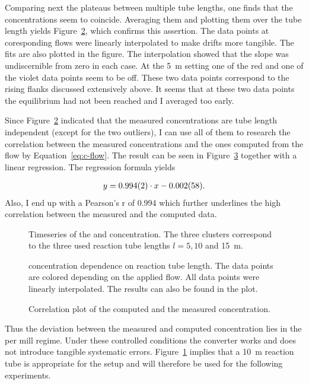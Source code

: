 Comparing next the  plateaus between multiple tube lengths, one
finds that the concentrations seem to coincide. Averaging them and
plotting them over the tube length yields Figure~\ref{fig:no-length},
which confirms this assertion. The data points at coresponding flows
were linearly interpolated to make drifts more tangible. The fits are
also plotted in the figure. The interpolation showed that the slope
was undiscernible from zero in each case. At the \SI{5}{\meter}
setting one of the red and one of the violet data points seem to be
off. These two data points correspond to the rising flanks discussed
extensively above. It seems that at these two data points the
equilibrium had not been reached and I averaged too early.

Since Figure~\ref{fig:no-length} indicated that the measured
concentrations are tube length independent (except for the two
outliers), I can use all of them to research the correlation between
the measured concentrations and the ones computed from the flow by
Equation~\eqref{eq:c-flow}. The result can be seen in
Figure~\ref{fig:no-calib} together with a linear regression. The
regression formula yields

\begin{align*}
  y = \num{0.994 \pm 0.002}  \cdot x -\num{0.002 \pm 0.058}.
\end{align*}
Also, I end up with a Pearson's r of 0.994 which further underlines the high
correlation between the measured and the computed data.
\begin{figure}[htbp]
  \centering
  
  \hfill
  
  \caption{Timeseries of the  and  concentration. The
    three clusters correspond to the three used reaction tube lengths
    $l = 5, 10$ and \SI{15}{\meter}.}
  \label{fig:ts}
\end{figure}
\begin{figure}[htbp]
  \centering
  
  \caption{ concentration dependence on reaction tube
    length. The data points are colored depending on the applied
     flow. All data points were linearly interpolated. The
    results can also be found in the plot.}
  \label{fig:no-length}
\end{figure}

\begin{figure}[htbp]
  \centering
  
  \caption{Correlation plot of the computed and the measured 
    concentration.}
  \label{fig:no-calib}
\end{figure}

Thus the deviation between the measured and computed concentration
lies in the per mill regime. Under these controlled conditions the
converter works and does not introduce tangible systematic
errors. Figure~\ref{fig:ts} implies that a \SI{10}{\meter} reaction
tube is appropriate for the setup and will therefore be used for the
following experiments.

